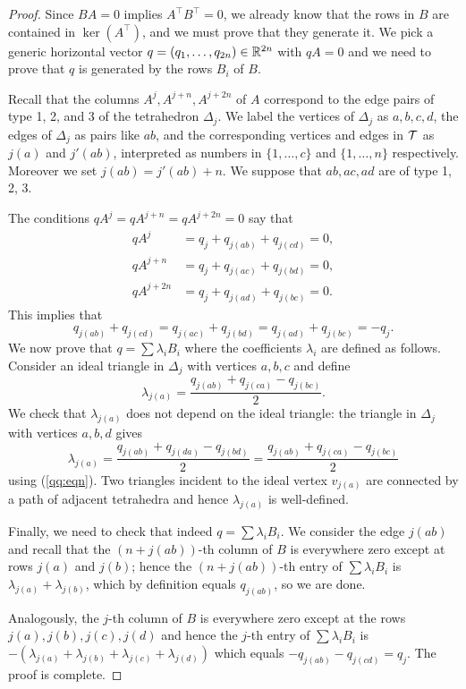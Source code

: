 \begin{proof}
Since $BA=0$ implies $A^\intercal B^\intercal=0$, we already know that the rows in $B$ are contained in $\ker(A^\intercal)$, and we must prove that they generate it. We pick a generic horizontal vector $q=(q_1, \ldots, q_{2n})\in \mathbb{R}^{2n}$ with $qA=0$ and we need to prove that $q$ is generated by the rows $B_i$ of $B$. 

Recall that the columns $A^j, A^{j+n}, A^{j+2n}$ of $A$ correspond to the edge pairs of type 1, 2, and 3 of the tetrahedron $\Delta_j$. We label the vertices of $\Delta_j$ as $a,b,c,d$, the edges of $\Delta_j$ as pairs like $ab$, and the corresponding vertices and edges in $\mathcal{T}$ as $j(a)$ and $j'(ab)$, interpreted as numbers in $\{1,\ldots,c\}$ and $\{1,\ldots, n\}$ respectively. Moreover we set $j(ab) = j'(ab)+n$. We suppose that $ab, ac, ad$ are of type 1, 2, 3.

The conditions $qA^j = qA^{j+n} = qA^{j+2n}=0$ say that
$$
\begin{aligned}
qA^j & = q_j + q_{j(ab)} + q_{j(cd)} = 0, \\
qA^{j+n} & = q_j + q_{j(ac)} + q_{j(bd)} = 0, \\
qA^{j+2n} & = q_j + q_{j(ad)} + q_{j(bc)} = 0. 
\end{aligned}
$$
This implies that
\begin{equation} \label{qq:eqn}
q_{j(ab)} + q_{j(cd)} = q_{j(ac)} + q_{j(bd)} = q_{j(ad)} + q_{j(bc)} = - q_j.
\end{equation}
We now prove that $q= \sum \lambda_i B_i$ where the coefficients $\lambda_i$ are defined as follows. Consider an ideal triangle in $\Delta_j$ with vertices $a,b,c$ and define
$$\lambda_{j(a)} = \frac{q_{j(ab)} + q_{j(ca)} - q_{j(bc)}}2.$$
We check that $\lambda_{j(a)}$ does not depend on the ideal triangle: the triangle in $\Delta_j$ with vertices $a,b,d$ gives 
$$\lambda_{j(a)} = \frac{q_{j(ab)} + q_{j(da)} - q_{j(bd)}}2 = \frac{q_{j(ab)} + q_{j(ca)} - q_{j(bc)}}2$$
using (\ref{qq:eqn}). Two triangles incident to the ideal vertex $v_{j(a)}$ are connected by a path of adjacent tetrahedra and hence $\lambda_{j(a)}$ is well-defined.

Finally, we need to check that indeed $q = \sum \lambda_iB_i$. We consider the edge $j(ab)$ and recall that the $(n+j(ab))$-th column of $B$ is everywhere zero except at rows $j(a)$ and $j(b)$; hence the $(n+j(ab))$-th entry of $\sum \lambda_iB_i$ is $\lambda_{j(a)} + \lambda_{j(b)}$, which by definition equals $q_{j(ab)}$, so we are done.

Analogously, the $j$-th column of $B$ is everywhere zero except at the rows $j(a),j(b),j(c),j(d)$ and hence the $j$-th entry of $\sum \lambda_iB_i$ is $-(\lambda_{j(a)} + \lambda_{j(b)} + \lambda_{j(c)} + \lambda_{j(d)})$ which equals $-q_{j(ab)} - q_{j(cd)} = q_j$. The proof is complete.
\end{proof}

